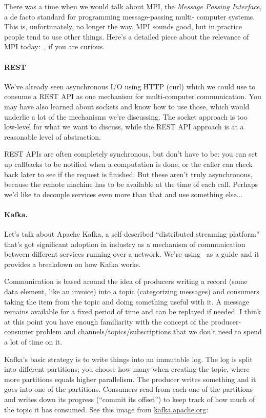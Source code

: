 \documentclass[a4paper]{report}
\begin{document}
There was a time when we would talk about MPI, the \emph{Message Passing 
Interface}, a de facto standard for programming message-passing multi-
computer systems. This is, unfortunately, no longer the way. 
MPI sounds good, but in practice people tend to use other things. 
Here's a detailed piece about the relevance of MPI today:~\cite{hpcmpi}, if 
you are curious. 

\paragraph{REST}
We've already seen asynchronous I/O using HTTP (curl) which we could use to
consume a REST API as one mechanism for multi-computer communication. You
may have also learned about sockets and know how to use those, which would
underlie a lot of the mechanisms we're discussing. The socket approach is too
low-level for what we want to discuss, while the REST API approach is at a
reasonable level of abstraction. 

REST APIs are often completely synchronous, but don't have to be: 
you can set up  callbacks to be notified when a computation is done, or
the caller can check back later to see if the request is finished. But these
aren't truly asynchronous, because the remote machine has to be available at
the time of each call. Perhaps we'd like to decouple services even more than
that and use something else...

\paragraph{Kafka.} 
Let's talk about Apache Kafka, a self-described ``distributed streaming platform'' that's got significant adoption in industry as a mechanism of communication between different services running over a network. We're using~\cite{kafka} as a guide and it provides a breakdown on how Kafka works.

Communication is based around the idea of producers writing a record (some data element, like an invoice) into a topic (categorizing messages) and consumers taking the item from the topic and doing something useful with it. A message remains available for a fixed period of time and can be replayed if needed. I think at this point you have enough familiarity with the concept of the producer-consumer problem and channels/topics/subscriptions that we don't need to spend a lot of time on it. 


Kafka's basic strategy is to write things into an immutable log. The log is split into different partitions; you choose how many when creating the topic, where more partitions equals higher parallelism. The producer writes something and it goes into one of the partitions. Consumers read from each one of the partitions and writes down its progress (``commit its offset'') to keep track of how much of the topic it has consumed.  See this image from \url{kafka.apache.org}:
\end{document}
